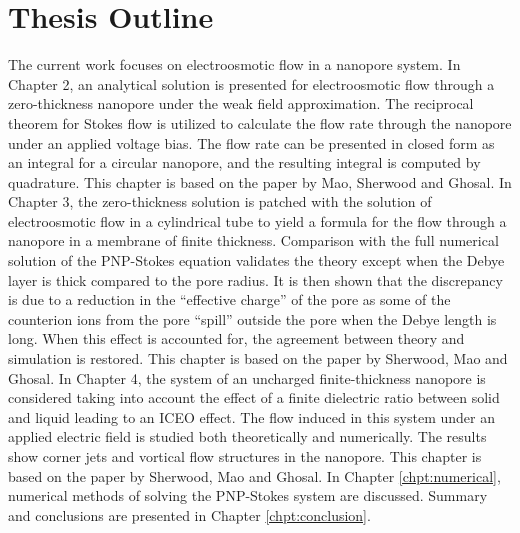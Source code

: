 \section{Thesis Outline}
The current work focuses on electroosmotic flow in a nanopore system. In Chapter 2, an analytical solution is presented for electroosmotic flow through a zero-thickness nanopore under the weak field approximation. The reciprocal theorem for Stokes flow is utilized to calculate the flow rate through the nanopore under an applied voltage bias. The flow rate can be presented in closed form as an integral for a circular nanopore, and the resulting integral is computed by quadrature. This chapter is based on the paper \cite{mao2014} by Mao, Sherwood and Ghosal. In Chapter 3, the zero-thickness solution is patched with the solution of electroosmotic flow in a cylindrical tube to yield a formula for the flow 
through a nanopore in a membrane of finite thickness. Comparison with the full numerical solution of the PNP-Stokes 
equation validates the theory except when the Debye layer is thick compared to the pore radius. It is then shown that 
the discrepancy is due to a reduction in the ``effective charge'' of the pore as some of the counterion ions 
from the pore ``spill'' outside the pore when the Debye length is long. When this effect is accounted for, the 
agreement between theory and simulation is restored. This chapter is based on the paper \cite{sherwood2014} by Sherwood, Mao and Ghosal. In Chapter 4, the system of an uncharged finite-thickness nanopore is considered taking into account the effect of a finite dielectric ratio between solid and liquid leading to an ICEO effect. The flow induced in this system under an applied electric field is studied both theoretically and numerically. The results show corner jets and vortical flow structures in the nanopore. This chapter is based on the paper \cite{sherwood2014electrically} by Sherwood, Mao and Ghosal. In Chapter \ref{chpt:numerical}, numerical methods of solving the PNP-Stokes system are discussed. Summary and conclusions are presented in Chapter \ref{chpt:conclusion}. 